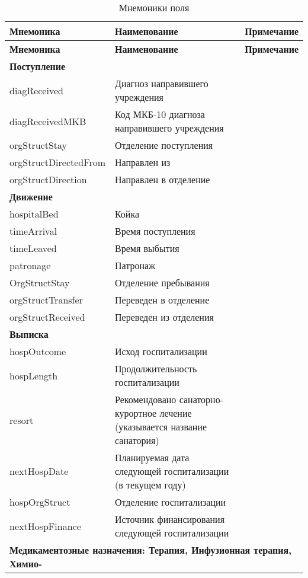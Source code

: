 {\small
\begin{longtable}{|p{4.1cm}|p{7.6cm}|p{5cm}|}
\caption{Мнемоники поля  \label{tbl_spr_kod}} \\
\hline \rule{0pt}{15pt} \centering \textbf{Мнемоника} & \centering \textbf{Наименование} & \hfil \textbf{Примечание} \\ \hline
\endfirsthead
\hline \rule{0pt}{15pt} \centering \textbf{Мнемоника} & \centering \textbf{Наименование} & \hfil \textbf{Примечание} \\ \hline
\endhead
\multicolumn{3}{|l|}{\textbf{Поступление}} \\ \hline
diagReceived	& Диагноз направившего учреждения &  \\ \hline	
diagReceivedMKB	& Код МКБ-10 диагноза направившего учреждения	&  \\ \hline
orgStructStay	& Отделение поступления &  \\ \hline	
orgStructDirectedFrom & 	Направлен из &  \\ \hline	
orgStructDirection	& Направлен в отделение &  \\ \hline	
\multicolumn{3}{|l|}{\textbf{Движение}}  \\ \hline
hospitalBed &	Койка &  \\ \hline 	
timeArrival	& Время поступления &  \\ \hline	
timeLeaved	& Время выбытия &  \\ \hline	
patronage	& Патронаж &  \\ \hline	
OrgStructStay	& Отделение пребывания &  \\ \hline	
orgStructTransfer	& Переведен в отделение &  \\ \hline	
orgStructReceived	& Переведен из отделения &  \\ \hline	
\multicolumn{3}{|l|}{\textbf{Выписка}}  \\ \hline 
hospOutcome	& Исход госпитализации &  \\ \hline	
hospLength	& Продолжительность госпитализации &  \\ \hline	
resort	& Рекомендовано санаторно-курортное лечение (указывается название санатория) &  \\ \hline	
nextHospDate	& Планируемая дата следующей госпитализации (в текущем году) &  \\ \hline	
hospOrgStruct	& Отделение госпитализации &  \\ \hline	
nextHospFinance	& Источник финансирования следующей госпитализации	&  \\ \hline
\multicolumn{3}{|l|}{\textbf{Медикаментозные назначения: Терапия, Инфузионная терапия, Химио-}}  \\

\end{longtable}}
